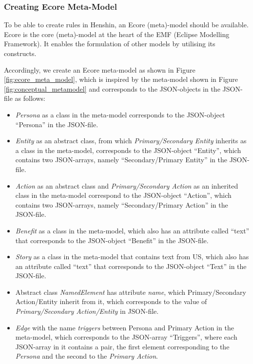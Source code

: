 \subsubsection*{Creating Ecore Meta-Model}\label{workflow_ecore}
To be able to create rules in Henshin, an Ecore (meta)-model should be available. Ecore is the core (meta)-model at the heart of the EMF (Eclipse Modelling Framework). It enables the formulation of other models by utilising its constructs.

Accordingly, we create an Ecore meta-model as shown in Figure \ref{fig:ecore_meta_model}, which is inspired by the meta-model shown in Figure \ref{fig:conceptual_metamodel} and corresponds to the JSON-objects in the JSON-file as follows:
\begin{itemize}
	\item \textit{Persona} as a class in the meta-model corresponds to the JSON-object \enquote{Persona} in the JSON-file.
	\item \textit{Entity} as an abstract class, from which \textit{Primary/Secondary Entity} inherits as a class in the meta-model, corresponds to the JSON-object \enquote{Entity}, which contains two JSON-arrays, namely \enquote{Secondary/Primary Entity} in the JSON-file.
	\item \textit{Action} as an abstract class and \textit{Primary/Secondary Action} as an inherited class in the meta-model correspond to the JSON-object \enquote{Action}, which contains two JSON-arrays, namely \enquote{Secondary/Primary Action} in the JSON-file.
	\item \textit{Benefit} as a class in the meta-model, which also has an attribute called \enquote{text} that corresponds to the JSON-object \enquote{Benefit} in the JSON-file.
	\item \textit{Story} as a class in the meta-model that contains text from US, which also has an attribute called \enquote{text} that corresponds to the JSON-object \enquote{Text} in the JSON-file.
	\item Abstract class \textit{NamedElement} has attribute \textit{name}, which Primary/Secondary Action/Entity inherit from it, which corresponds to the value of \textit{Primary/Secondary Action/Entity} in JSON-file.
	\item \textit{Edge} with the name \textit{triggers} between Persona and Primary Action in the meta-model, which corresponds to the JSON-array \enquote{Triggers}, where each JSON-array in it contains a pair, the first element corresponding to the \textit{Persona} and the second to the \textit{Primary Action}.

\end{itemize}
